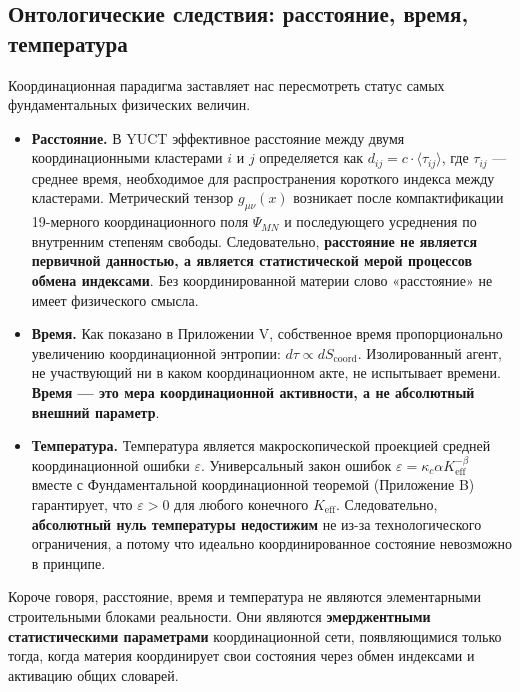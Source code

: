 \documentclass[12pt,a4paper]{article}
\begin{document}
	\subsection{Онтологические следствия: расстояние, время, температура}
	
	Координационная парадигма заставляет нас пересмотреть статус самых фундаментальных физических величин.
	
	\begin{itemize}
		\item \textbf{Расстояние.} В YUCT эффективное расстояние между двумя координационными кластерами \(i\) и \(j\) определяется как \(d_{ij} = c \cdot \langle \tau_{ij} \rangle\), где \(\tau_{ij}\) — среднее время, необходимое для распространения короткого индекса между кластерами. Метрический тензор \(g_{\mu\nu}(x)\) возникает после компактификации 19-мерного координационного поля \(\Psi_{MN}\) и последующего усреднения по внутренним степеням свободы. Следовательно, \textbf{расстояние не является первичной данностью, а является статистической мерой процессов обмена индексами}. Без координированной материи слово «расстояние» не имеет физического смысла.
		
		\item \textbf{Время.} Как показано в Приложении V, собственное время пропорционально увеличению координационной энтропии: \(d\tau \propto dS_{\mathrm{coord}}\). Изолированный агент, не участвующий ни в каком координационном акте, не испытывает времени. \textbf{Время — это мера координационной активности, а не абсолютный внешний параметр}.
		
		\item \textbf{Температура.} Температура является макроскопической проекцией средней координационной ошибки \(\varepsilon\). Универсальный закон ошибок \(\varepsilon = \kappa_c \alpha K_{\mathrm{eff}}^{-\beta}\) вместе с Фундаментальной координационной теоремой (Приложение B) гарантирует, что \(\varepsilon > 0\) для любого конечного \(K_{\mathrm{eff}}\). Следовательно, \textbf{абсолютный нуль температуры недостижим} не из-за технологического ограничения, а потому что идеально координированное состояние невозможно в принципе.
	\end{itemize}
	
	Короче говоря, расстояние, время и температура не являются элементарными строительными блоками реальности. Они являются \textbf{эмерджентными статистическими параметрами} координационной сети, появляющимися только тогда, когда материя координирует свои состояния через обмен индексами и активацию общих словарей.
	
\end{document}
